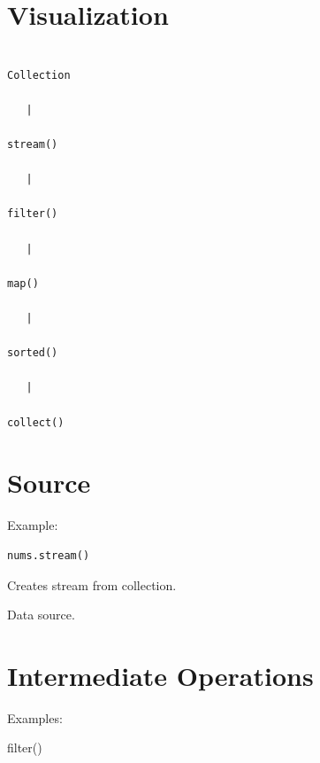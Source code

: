 \documentclass[11pt,a4paper]{book}
\begin{document}

\section{Visualization}

\begin{verbatim}

Collection

   |

stream()

   |

filter()

   |

map()

   |

sorted()

   |

collect()

\end{verbatim}



\section{Source}

Example:

\begin{verbatim} 
nums.stream()
\end{verbatim}


Creates stream from collection.


Data source.


\section{Intermediate Operations}

Examples:


filter()

\end{document}
